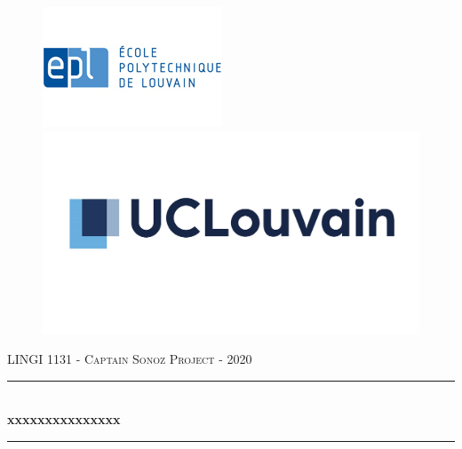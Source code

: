 
\begin{titlepage}

  \begin{sffamily}
  
  \begin{center}  
        
        \begin{figure}[h]
            \begin{minipage}[c]{0.5\textwidth}
            \flushleft
            \includegraphics[scale=0.8]{Structure/LogoEPL.jpg}
            \end{minipage}%
            \begin{minipage}[c]{0.5\textwidth}
            \includegraphics[scale=0.37]{Structure/LogoUCLouvain2.jpg}
            \flushright 
            \end{minipage}
        \end{figure}
        
\vfill

        \textsc{\LARGE LINGI 1131  - Captain Sonoz Project -  2020}\\[0.3cm]
        \rule{16cm}{1pt}
        \medskip
        \\
        { \huge \bfseries xxxxxxxxxxxxxxx \\[0.2cm] }
        \rule{16cm}{1pt}
        \\
    

\end{center}
\end{sffamily}
\end{titlepage}
